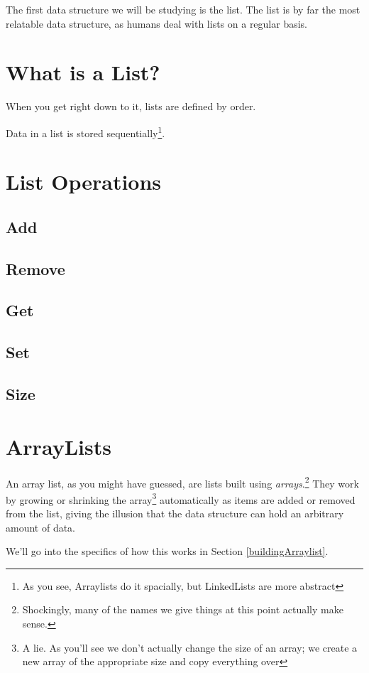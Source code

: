 \documentclass[10pt,a4paper]{book}
\begin{document}
\label{arraylist}
The first data structure we will be studying is the list.
The list is by far the most relatable data structure, as humans deal with lists on a regular basis.

\section{What is a List?}
When you get right down to it, lists are defined by order.


Data in a list is stored sequentially\footnote{As you see, Arraylists do it spacially, but LinkedLists are more abstract}.

\section{List Operations}

\subsection{Add}  
\subsection{Remove}
\subsection{Get}
\subsection{Set}
\subsection{Size}


\section{ArrayLists}
An array list, as you might have guessed, are lists built using \textit{arrays}.\footnote{Shockingly, many of the names we give things at this point actually make sense.}
They work by growing or shrinking the array\footnote{A lie.  As you'll see we don't actually change the size of an array;  we create a new array of the appropriate size and copy everything over} automatically as items are added or removed from the list, giving the illusion that the data structure can hold an arbitrary amount of data.

We'll go into the specifics of how this works in Section \ref{buildingArraylist}.
\end{document}
